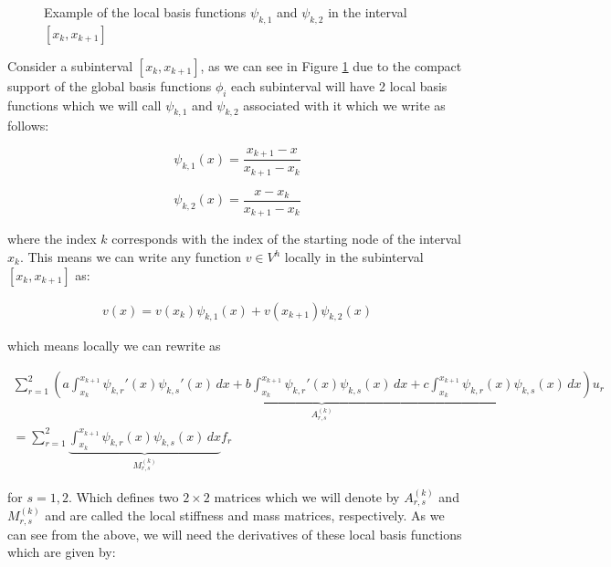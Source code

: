 \begin{figure}
\centering

\caption{Example of the local basis functions $\psi_{k,1}$ and $\psi_{k,2}$
         in the interval $[x_k, x_{k + 1}]$}
\label{fig:oned-local-basis}
\end{figure}

Consider a subinterval $[x_k, x_{k+1}]$, as we can see in Figure
\ref{fig:oned-local-basis} due to the compact support of the global basis
functions $\phi_i$ each subinterval will have 2 local basis functions which we
will call $\psi_{k,1}$ and $\psi_{k,2}$ associated with it which we write as
follows:

\begin{equation}\label{eq:oned-deterministic-psi-1}
    \psi_{k,1}(x) = \frac{x_{k+1} - x}{x_{k+1} - x_k}
\end{equation}

\begin{equation}\label{eq:oned-deterministic-psi-2}
    \psi_{k,2}(x) = \frac{x - x_k}{x_{k+1} - x_k}
\end{equation}

where the index $k$ corresponds with the index of the starting node of the
interval $x_k$.  This means we can write any function $v \in V^h$ locally in
the subinterval $[x_k, x_{k+1}]$ as:

\begin{align*}
    v(x) = v(x_k)\psi_{k,1}(x) + v(x_{k+1})\psi_{k,2}(x)
\end{align*}

which means locally we can rewrite  as

\begin{equation}\label{eq:oned-deterministic-local-discrete}
  \begin{split}
    \sum_{r = 1}^2\underbrace{\left(
          a\int_{x_k}^{x_{k+1}}\psi_{k,r}'(x)\psi_{k,s}'(x)\, dx
        + b\int_{x_k}^{x_{k+1}}\psi_{k,r}'(x)\psi_{k,s}(x)\, dx
        + c\int_{x_k}^{x_{k+1}}\psi_{k,r}(x)\psi_{k,s}(x)\, dx
    \right)}_{A^{(k)}_{r,s}}u_r  \\
    = \sum_{r= 1}^2\underbrace{
            \int_{x_k}^{x_{k+1}}{\psi_{k,r}(x)\psi_{k,s}(x)}\, dx}_{M^{(k)}_{r,s}}f_r
  \end{split}
\end{equation}

for $s = 1,2$. Which defines two $2 \times 2$ matrices which we will denote by
$A^{(k)}_{r,s}$ and $M^{(k)}_{r,s}$ and are called the local stiffness and
mass matrices, respectively. As we can see from the above, we will need the
derivatives of these local basis functions which are given by:

